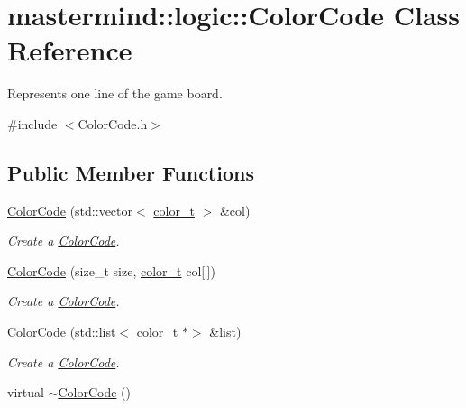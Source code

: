 \hypertarget{classmastermind_1_1logic_1_1_color_code}{}\section{mastermind\+:\+:logic\+:\+:Color\+Code Class Reference}
\label{classmastermind_1_1logic_1_1_color_code}


Represents one line of the game board.  




{\ttfamily \#include $<$Color\+Code.\+h$>$}

\subsection*{Public Member Functions}
\begin{DoxyCompactItemize}
\item 
\hyperlink{classmastermind_1_1logic_1_1_color_code_a9bc91c2e878553c2e7a5b0821b76c525}{Color\+Code} (std\+::vector$<$ \hyperlink{namespacemastermind_1_1logic_aab4e2166db8e8e5dcbed785c7927eca1}{color\+\_\+t} $>$ \&col)
\begin{DoxyCompactList}\small\item\em Create a \hyperlink{classmastermind_1_1logic_1_1_color_code}{Color\+Code}. \end{DoxyCompactList}\item 
\hyperlink{classmastermind_1_1logic_1_1_color_code_ab4f174ea13758a5328f23daf26d8d61f}{Color\+Code} (size\+\_\+t size, \hyperlink{namespacemastermind_1_1logic_aab4e2166db8e8e5dcbed785c7927eca1}{color\+\_\+t} col\mbox{[}$\,$\mbox{]})
\begin{DoxyCompactList}\small\item\em Create a \hyperlink{classmastermind_1_1logic_1_1_color_code}{Color\+Code}. \end{DoxyCompactList}\item 
\hyperlink{classmastermind_1_1logic_1_1_color_code_ae407455b2aa672f8183cad6ec76bc848}{Color\+Code} (std\+::list$<$ \hyperlink{namespacemastermind_1_1logic_aab4e2166db8e8e5dcbed785c7927eca1}{color\+\_\+t} $\ast$$>$ \&list)
\begin{DoxyCompactList}\small\item\em Create a \hyperlink{classmastermind_1_1logic_1_1_color_code}{Color\+Code}. \end{DoxyCompactList}\item 
virtual \hyperlink{classmastermind_1_1logic_1_1_color_code_aee5e4a3d13fd9e2e2c69964fdffe04cf}{$\sim$\+Color\+Code} ()
$$
\end{DoxyCompactItemize}
